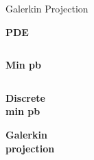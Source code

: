 \begin{frame}{Galerkin Projection}
\begin{center}
\begin{tcolorbox}
			\vspace{5pt}
		
			\begin{minipage}{0.1\linewidth}
				\centering
				\textbf{PDE}
			\end{minipage} $\; \quad \;$ \begin{minipage}{0.1\linewidth}
				\centering
				\textbf{Min pb}
			\end{minipage} $\; \quad \;$ \begin{minipage}{0.1\linewidth}
				\centering
				\textbf{Discrete} \\
				\textbf{min pb}
			\end{minipage} \; \hspace{60pt} \; \begin{minipage}{0.1\linewidth}
				\centering
				\textbf{Galerkin} \\
				\textbf{projection}
			\end{minipage}
		\end{tcolorbox}
	\end{center}
\end{frame}

